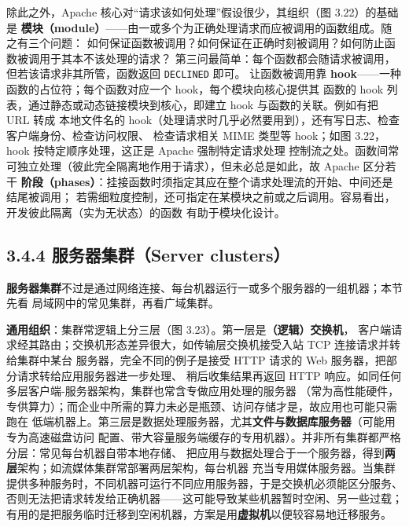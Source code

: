 \medskip\noindent 除此之外，Apache 核心对“请求该如何处理”假设很少，其组织（图 3.22）的基础是
\textbf{模块（module）}——由一或多个为正确处理请求而应被调用的函数组成。随之有三个问题：
如何保证函数被调用？如何保证在正确时刻被调用？如何防止函数被调用于其本不该处理的请求？
第三问最简单：每个函数都会随请求被调用，但若该请求非其所管，函数返回 \texttt{DECLINED} 即可。
让函数被调用靠 \textbf{hook}——一种函数的占位符；每个函数对应一个 hook，每个模块向核心提供其
函数的 hook 列表，通过静态或动态链接模块到核心，即建立 hook 与函数的关联。例如有把 URL 转成
本地文件名的 hook（处理请求时几乎必然要用到），还有写日志、检查客户端身份、检查访问权限、
检查请求相关 MIME 类型等 hook；如图 3.22，hook 按特定顺序处理，这正是 Apache 强制特定请求处理
控制流之处。函数间常可独立处理（彼此完全隔离地作用于请求），但未必总是如此，故 Apache 区分若干
\textbf{阶段（phases）}：挂接函数时须指定其应在整个请求处理流的开始、中间还是结尾被调用；
若需细粒度控制，还可指定在某模块之前或之后调用。容易看出，开发彼此隔离（实为无状态）的函数
有助于模块化设计。

\begin{closeread}
\end{closeread}


\subsection*{3.4.4 服务器集群（Server clusters）}
\textbf{服务器集群}不过是通过网络连接、每台机器运行一或多个服务器的一组机器；本节先看
局域网中的常见集群，再看广域集群。

\medskip\noindent\textbf{通用组织}：集群常逻辑上分三层（图 3.23）。第一层是\textbf{（逻辑）交换机}，
客户端请求经其路由；交换机形态差异很大，如传输层交换机接受入站 TCP 连接请求并转给集群中某台
服务器，完全不同的例子是接受 HTTP 请求的 Web 服务器，把部分请求转给应用服务器进一步处理、
稍后收集结果再返回 HTTP 响应。如同任何多层客户端-服务器架构，集群也常含专做应用处理的服务器
（常为高性能硬件，专供算力）；而企业中所需的算力未必是瓶颈、访问存储才是，故应用也可能只需跑在
低端机器上。第三层是数据处理服务器，尤其\textbf{文件与数据库服务器}（可能用专为高速磁盘访问
配置、带大容量服务端缓存的专用机器）。并非所有集群都严格分层：常见每台机器自带本地存储、
把应用与数据处理合于一个服务器，得到\textbf{两层}架构；如流媒体集群常部署两层架构，每台机器
充当专用媒体服务器。当集群提供多种服务时，不同机器可运行不同应用服务器，于是交换机必须能区分服务、
否则无法把请求转发给正确机器——这可能导致某些机器暂时空闲、另一些过载；
有用的是把服务临时迁移到空闲机器，方案是用\textbf{虚拟机}以便较容易地迁移服务。

